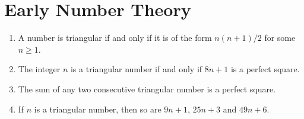 \section{Early Number Theory}

\begin{exercise}
    \begin{enumerate}
        \item A number is triangular if and only if it is of the form $n(n+1)/2$ for some $n \geq 1$.
        \item The integer $n$ is a triangular number if and only if $8n+1$ is a perfect square.
        \item The sum of any two consecutive triangular number is a perfect square.
        \item If $n$ is a triangular number, then so are $9n+1$, $25n+3$ and $49n + 6$.
    \end{enumerate}
\end{exercise}

